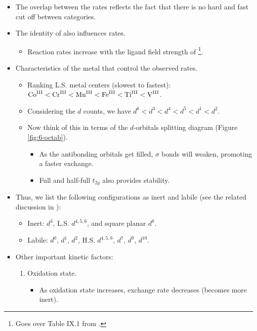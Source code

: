 \documentclass[../notes.tex]{subfiles}
\begin{document}
\begin{itemize}
\begin{enumerate}[label={\Roman*)}]
    \end{enumerate}
    \item The overlap between the rates reflects the fact that there is no hard and fast cut off between categories.
    \item The identity of  also influences rates.
    \begin{itemize}
        \item Reaction rates increase with the ligand field strength of \footnote{Goes over Table IX.1 from \textcite{bib:CHEM20100Notes}.}.
    \end{itemize}
    \item Characteristics of the metal that control the observed rates.
    \begin{itemize}
        \item Ranking L.S. metal centers (slowest to fastest): $\ce{Co^{III}}<\ce{Cr^{III}}<\ce{Mn^{III}}<\ce{Fe^{III}}<\ce{Ti^{III}}<\ce{V^{III}}$.
        \item Considering the $d$ counts, we have $d^6<d^3<d^4<d^5<d^1<d^2$.
        \item Now think of this in terms of the $d$-orbitals splitting diagram (Figure \ref{fig:6-octab}).
        \begin{itemize}
            \item As the antibonding orbitals get filled, $\sigma$ bonds will weaken, promoting a faster exchange.
            \item Full and half-full $t_{2g}$ also provides stability.
        \end{itemize}
    \end{itemize}
    \item Thus, we list the following configurations as inert and labile (see the related discussion in \textcite{bib:CHEM20100Notes}):
    \begin{itemize}
        \item Inert: $d^3$, L.S. $d^{4,5,6}$, and square planar $d^8$.
        \item Labile: $d^0$, $d^1$, $d^2$, H.S. $d^{4,5,6}$, $d^7$, $d^9$, $d^{10}$.
    \end{itemize}
    \item Other important kinetic factors:
    \begin{enumerate}
        \item Oxidation state.
        \begin{itemize}
            \item As oxidation state increases, exchange rate decreases (becomes more inert).

\end{itemize}
\end{enumerate}
\end{itemize}
\end{document}
